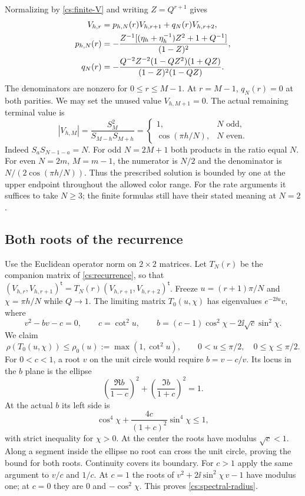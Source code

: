 Normalizing by \eqref{cs:finite-V} and writing $Z=Q^{r+1}$ gives
\begin{align}
 V_{h,r}&=p_{h,N}(r)V_{h,r+1}+q_N(r)V_{h,r+2},\label{cs:recurrence}\\
 p_{h,N}(r)&=-\frac{Z^{-1}[(\eta_h+\eta_h^{-1})Z^2+1+Q^{-1}]}{(1-Z)^2},\notag\\
 q_N(r)&=-\frac{Q^{-2}Z^{-2}(1-QZ^2)(1+QZ)}
 {(1-Z)^2(1-QZ)}.\notag
\end{align}
The denominators are nonzero for $0\le r\le M-1$. At $r=M-1$, $q_N(r)=0$ at both parities. We may set the unused value $V_{h,M+1}=0$. The actual remaining terminal value is
\begin{equation}\label{cs:terminal}
 |V_{h,M}|=\frac{S_M^2}{S_{M-h}S_{M+h}}
 =\begin{cases}1,&N\text{ odd},\\ \cos(\pi h/N),&N\text{ even}.
 \end{cases}
\end{equation}
Indeed $S_aS_{N-1-a}=N$. For odd $N=2M+1$ both products in the ratio equal $N$. For even $N=2m$, $M=m-1$, the numerator is $N/2$ and the denominator is $N/(2\cos(\pi h/N))$. Thus the prescribed solution is bounded by one at the upper endpoint throughout the allowed color range. For the rate arguments it suffices to take $N\ge3$; the finite formulas still have their stated meaning at $N=2$.

\subsection{Both roots of the recurrence}
Use the Euclidean operator norm on $2\times2$ matrices. Let $T_N(r)$ be the companion matrix of \eqref{cs:recurrence}, so that
$(V_{h,r},V_{h,r+1})^{\mathsf t}=T_N(r)(V_{h,r+1},V_{h,r+2})^{\mathsf t}$.
Freeze $u=(r+1)\pi/N$ and $\chi=\pi h/N$ while $Q\to1$. The limiting matrix $T_0(u,\chi)$ has eigenvalues $e^{-2\ii u}v$, where
\begin{equation}\label{cs:ellipse-polynomial}
 v^2-bv-c=0,\qquad c=\cot^2u,\qquad
 b=(c-1)\cos^2\chi-2\ii\sqrt c\sin^2\chi.
\end{equation}
We claim
\begin{equation}\label{cs:spectral-radius}
 \rho(T_0(u,\chi))\le\rho_0(u):=\max(1,\cot^2u),
 \qquad 0<u\le\pi/2,\quad0\le\chi\le\pi/2.
\end{equation}
For $0<c<1$, a root $v$ on the unit circle would require $b=v-c/v$. Its locus in the $b$ plane is the ellipse
\[
 \left(\frac{\Re b}{1-c}\right)^2+
 \left(\frac{\Im b}{1+c}\right)^2=1.
\]
At the actual $b$ its left side is
\[
 \cos^4\chi+\frac{4c}{(1+c)^2}\sin^4\chi\le1,
\]
with strict inequality for $\chi>0$. At the center the roots have modulus $\sqrt c<1$. Along a segment inside the ellipse no root can cross the unit circle, proving the bound for both roots. Continuity covers its boundary. For $c>1$ apply the same argument to $v/c$ and $1/c$. At $c=1$ the roots of $v^2+2\ii\sin^2\chi\,v-1$ have modulus one; at $c=0$ they are $0$ and $-\cos^2\chi$. This proves \eqref{cs:spectral-radius}.

